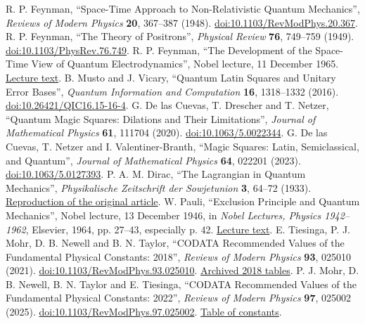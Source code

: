 
{}
 R. P. Feynman, ``Space-Time Approach to Non-Relativistic Quantum Mechanics'', \emph{Reviews of Modern Physics} \textbf{20}, 367--387 (1948). \href{https://doi.org/10.1103/RevModPhys.20.367}{doi:10.1103/RevModPhys.20.367}.
 R. P. Feynman, ``The Theory of Positrons'', \emph{Physical Review} \textbf{76}, 749--759 (1949). \href{https://doi.org/10.1103/PhysRev.76.749}{doi:10.1103/PhysRev.76.749}.
 R. P. Feynman, ``The Development of the Space-Time View of Quantum Electrodynamics'', Nobel lecture, 11 December 1965. \href{https://www.nobelprize.org/prizes/physics/1965/feynman/lecture/}{Lecture text}.
 B. Musto and J. Vicary, ``Quantum Latin Squares and Unitary Error Bases'', \emph{Quantum Information and Computation} \textbf{16}, 1318--1332 (2016). \href{https://doi.org/10.26421/QIC16.15-16-4}{doi:10.26421/QIC16.15-16-4}.
 G. De las Cuevas, T. Drescher and T. Netzer, ``Quantum Magic Squares: Dilations and Their Limitations'', \emph{Journal of Mathematical Physics} \textbf{61}, 111704 (2020). \href{https://doi.org/10.1063/5.0022344}{doi:10.1063/5.0022344}.
 G. De las Cuevas, T. Netzer and I. Valentiner-Branth, ``Magic Squares: Latin, Semiclassical, and Quantum'', \emph{Journal of Mathematical Physics} \textbf{64}, 022201 (2023). \href{https://doi.org/10.1063/5.0127393}{doi:10.1063/5.0127393}.
 P. A. M. Dirac, ``The Lagrangian in Quantum Mechanics'', \emph{Physikalische Zeitschrift der Sowjetunion} \textbf{3}, 64--72 (1933). \href{https://www.informationphilosopher.com/solutions/scientists/dirac/Lagrangian_1933.pdf}{Reproduction of the original article}.
 W. Pauli, ``Exclusion Principle and Quantum Mechanics'', Nobel lecture, 13 December 1946, in \emph{Nobel Lectures, Physics 1942--1962}, Elsevier, 1964, pp. 27--43, especially p. 42. \href{https://www.nobelprize.org/uploads/2018/06/pauli-lecture.pdf}{Lecture text}.
 E. Tiesinga, P. J. Mohr, D. B. Newell and B. N. Taylor, ``CODATA Recommended Values of the Fundamental Physical Constants: 2018'', \emph{Reviews of Modern Physics} \textbf{93}, 025010 (2021). \href{https://doi.org/10.1103/RevModPhys.93.025010}{doi:10.1103/RevModPhys.93.025010}. \href{https://physics.nist.gov/cuu/Constants/ArchiveASCII/allascii_2018.txt}{Archived 2018 tables}.
 P. J. Mohr, D. B. Newell, B. N. Taylor and E. Tiesinga, ``CODATA Recommended Values of the Fundamental Physical Constants: 2022'', \emph{Reviews of Modern Physics} \textbf{97}, 025002 (2025). \href{https://doi.org/10.1103/RevModPhys.97.025002}{doi:10.1103/RevModPhys.97.025002}. \href{https://physics.nist.gov/cuu/Constants/Table/allascii.txt}{Table of constants}.
